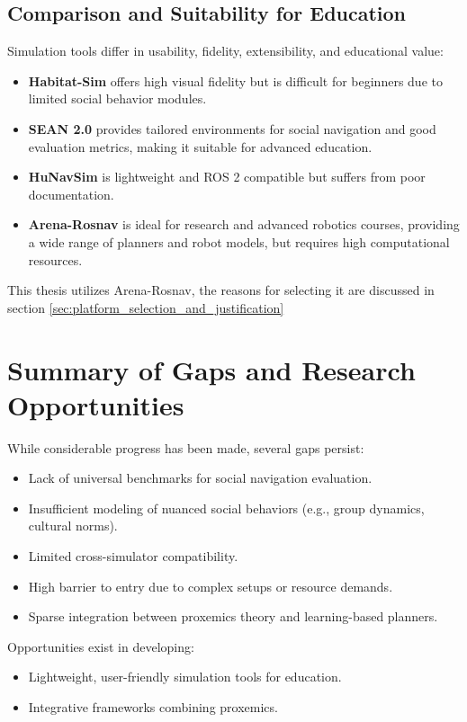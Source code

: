 
\subsection{Comparison and Suitability for Education}
Simulation tools differ in usability, fidelity, extensibility, and educational value:
\begin{itemize}
\item \textbf{Habitat-Sim} offers high visual fidelity but is difficult for beginners due 
to limited social behavior modules.
\item \textbf{SEAN 2.0} provides tailored environments for social navigation and good 
evaluation metrics, making it suitable for advanced education.
\item \textbf{HuNavSim} is lightweight and ROS 2 compatible but suffers from poor 
documentation.
\item \textbf{Arena-Rosnav} is ideal for research and advanced robotics courses, providing 
a wide range of planners and robot models, but requires high computational resources.
\end{itemize}
This thesis utilizes Arena-Rosnav, the reasons for selecting it are discussed in section 
\ref{sec:platform_selection_and_justification}

\section{Summary of Gaps and Research Opportunities}

While considerable progress has been made, several gaps persist:
\begin{itemize}
\item Lack of universal benchmarks for social navigation evaluation.
\item Insufficient modeling of nuanced social behaviors (e.g., group dynamics, cultural norms).
\item Limited cross-simulator compatibility.
\item High barrier to entry due to complex setups or resource demands.
\item Sparse integration between proxemics theory and learning-based planners.
\end{itemize}

Opportunities exist in developing:
\begin{itemize}
\item Lightweight, user-friendly simulation tools for education.
\item Integrative frameworks combining proxemics.
\end{itemize}